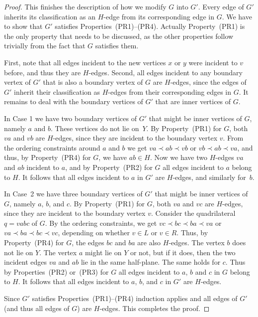 \begin{proof}
	
	
	This finishes the description of how we modify $G$ into $G'$. Every edge of $G'$ inherits its classification as an $H$-edge from its corresponding edge in $G$. We have to show that $G'$ satisfies Properties~(PR1)--(PR4). Actually Property~(PR1) is the only property that needs to be discussed, as the other properties follow trivially from the fact that $G$ satisfies them. 
%	
%	
	
	First, note that all edges incident to the new vertices $x$ or $y$
	were incident to $v$ before, and thus they are $H$-edges. Second,
	all edges incident to any boundary vertex of $G'$ that is also
	a boundary vertex of $G$ are $H$-edges, since the edges of $G'$
	inherit their classification as $H$-edges from their corresponding
	edges in $G$. It remains to deal with the boundary vertices of
	$G'$ that are inner vertices of $G$.

	In Case 1 we have two boundary vertices of $G'$ that might be
	inner vertices of $G$, namely $a$ and $b$. These vertices
	do not lie on~$Y$. By Property~(PR1) for $G$, both $va$ and
	$vb$ are $H$-edges, since they are incident to the boundary
	vertex $v$. From the ordering constraints around $a$ and $b$
	we get $va\prec ab\prec vb$ or $vb\prec ab\prec va$, and thus,
	by Property~(PR4) for $G$, we have $ab\in H$.  Now we have two
	$H$-edges $va$ and $ab$ incident to $a$, and by Property~(PR2)
	for $G$ all edges incident to $a$ belong to $H$. It follows that
	all edges incident to $a$ in $G'$ are $H$-edges, and similarly
	for~$b$.

	In Case~2 we have three boundary vertices of $G'$ that might be inner
	vertices of $G$, namely $a$, $b$, and $c$. By Property~(PR1) for
	$G$, both $va$ and $vc$ are $H$-edges, since they are incident
	to the boundary vertex $v$. Consider the quadrilateral $q=vabc$
	of $G$. By the ordering constraints, we get $vc \prec bc\prec
	ba\prec va$ or $va \prec ba\prec bc\prec vc$, depending on
	whether $v\in L$ or $v\in R$. Thus, by Property~(PR4) for $G$,
	the edges $bc$ and $ba$ are also $H$-edges. The vertex $b$ does
	not lie on $Y$. The vertex $a$ might lie on $Y$ or not, but if it
	does, then the two incident edges $va$ and $ab$ lie in the same
	half-plane.  The same holds for $c$. Thus by Properties~(PR2)
	or~(PR3) for $G$ all edges incident to $a$, $b$ and $c$ in $G$
	belong to $H$. It follows that all edges incident to $a$, $b$,
	and $c$ in $G'$ are $H$-edges.
	
	
	
	Since $G'$ satisfies Properties~(PR1)--(PR4) induction applies and all edges of $G'$ (and thus all edges of $G$) are $H$-edges. This completes the proof.
\end{proof}

